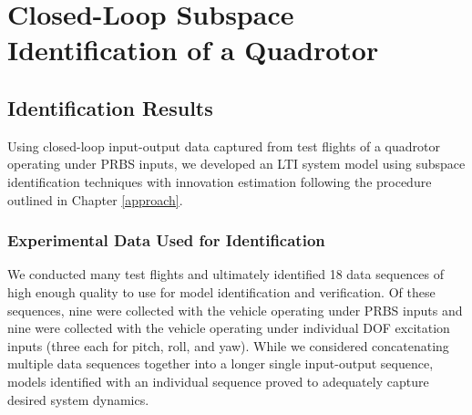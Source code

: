 \chapter{Closed-Loop Subspace Identification of a Quadrotor}\label{results}
\section{Identification Results}
Using closed-loop input-output data captured from test flights of a quadrotor operating under PRBS inputs, we developed an LTI system model using subspace identification techniques with innovation estimation following the procedure outlined in Chapter \ref{approach}.

\subsection{Experimental Data Used for Identification}
We conducted many test flights and ultimately identified 18 data sequences of high enough quality to use for model identification and verification. Of these sequences, nine were collected with the vehicle operating under PRBS inputs and nine were collected with the vehicle operating under individual DOF excitation inputs (three each for pitch, roll, and yaw). While we considered concatenating multiple data sequences together into a longer single input-output sequence, models identified with an individual sequence proved to adequately capture desired system dynamics.


